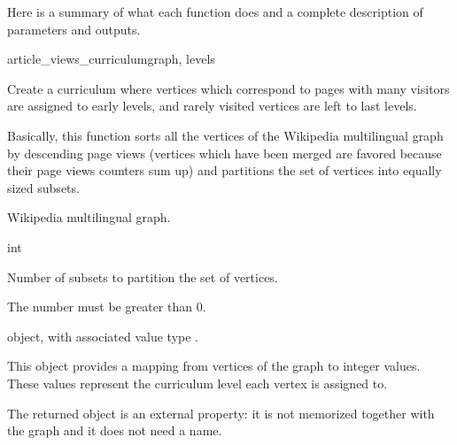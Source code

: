            Here is a summary of what each function does and a complete description of parameters and outputs.
            \begin{independentfunctiondoc}{article\_views\_curriculum}{graph, levels}
                \begin{functiondescription}
                    Create a curriculum where vertices which correspond to pages with many visitors are assigned to early levels, and rarely visited vertices are left to last levels.
                    
                    Basically, this function sorts all the vertices of the Wikipedia multilingual graph by descending page views (vertices which have been merged are favored because their page views counters sum up) and partitions the set of vertices into equally sized subsets.
                \end{functiondescription}
                
                \begin{functionparameters}
                    \item[graph] 
                    
                    Wikipedia multilingual graph.
                    \item[levels] int
                    
                    Number of subsets to partition the set of vertices.
                    
                    The number must be greater than 0.
                \end{functionparameters}
                
                \begin{functionoutput}
                     object, with associated value type .
                    
                    This object provides a mapping from vertices of the graph to integer values. These values represent the curriculum level each vertex is assigned to.
                    
                    The returned object is an external property: it is not memorized together with the graph and it does not need a name.
                \end{functionoutput}
            \end{independentfunctiondoc}
